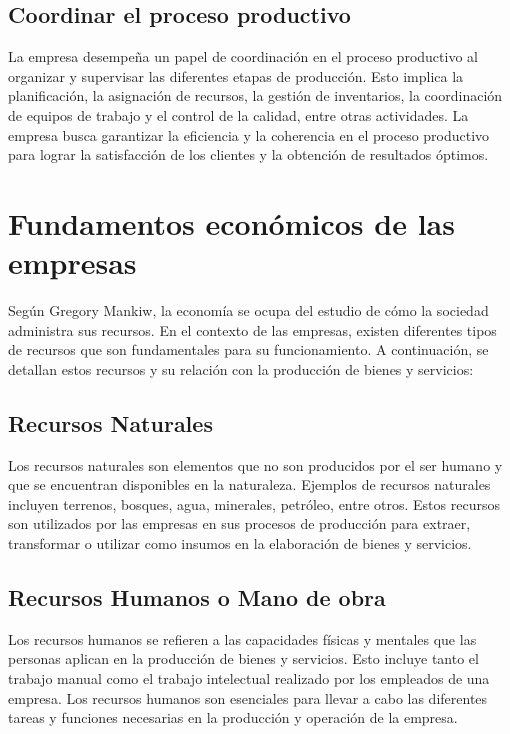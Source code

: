 \documentclass[
  man,
  floatsintext,
  longtable,
  a4paper,
  nolmodern,
  notxfonts,
  notimes,
  12pt,
  colorlinks=true,linkcolor=blue,citecolor=blue,urlcolor=blue]{apa7}
\begin{document}
\subsection{Coordinar el proceso
productivo}\label{coordinar-el-proceso-productivo}

La empresa desempeña un papel de coordinación en el proceso productivo
al organizar y supervisar las diferentes etapas de producción. Esto
implica la planificación, la asignación de recursos, la gestión de
inventarios, la coordinación de equipos de trabajo y el control de la
calidad, entre otras actividades. La empresa busca garantizar la
eficiencia y la coherencia en el proceso productivo para lograr la
satisfacción de los clientes y la obtención de resultados óptimos.

\section{Fundamentos económicos de las
empresas}\label{fundamentos-econuxf3micos-de-las-empresas}

Según Gregory Mankiw, la economía se ocupa del estudio de cómo la
sociedad administra sus recursos. En el contexto de las empresas,
existen diferentes tipos de recursos que son fundamentales para su
funcionamiento. A continuación, se detallan estos recursos y su relación
con la producción de bienes y servicios:

\subsection{Recursos Naturales}\label{recursos-naturales}

Los recursos naturales son elementos que no son producidos por el ser
humano y que se encuentran disponibles en la naturaleza. Ejemplos de
recursos naturales incluyen terrenos, bosques, agua, minerales,
petróleo, entre otros. Estos recursos son utilizados por las empresas en
sus procesos de producción para extraer, transformar o utilizar como
insumos en la elaboración de bienes y servicios.

\subsection{Recursos Humanos o Mano de
obra}\label{recursos-humanos-o-mano-de-obra}

Los recursos humanos se refieren a las capacidades físicas y mentales
que las personas aplican en la producción de bienes y servicios. Esto
incluye tanto el trabajo manual como el trabajo intelectual realizado
por los empleados de una empresa. Los recursos humanos son esenciales
para llevar a cabo las diferentes tareas y funciones necesarias en la
producción y operación de la empresa.
\end{document}
